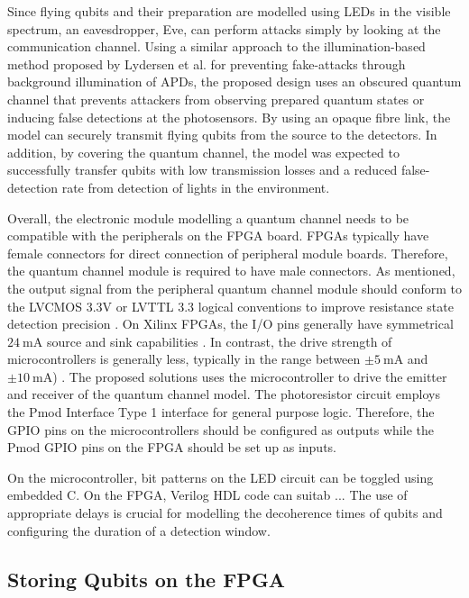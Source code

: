 Since flying qubits and their preparation are modelled using LEDs in the visible spectrum, an eavesdropper, Eve, can perform attacks simply by looking at the communication channel. Using a similar approach to the illumination-based method proposed by Lydersen et al. for preventing fake-attacks through background illumination of APDs, the proposed design uses an obscured quantum channel that prevents attackers from observing prepared quantum states or inducing false detections at the photosensors. By using an opaque fibre link, the model can securely transmit flying qubits from the source to the detectors. In addition, by covering the quantum channel, the model was expected to successfully transfer qubits with low transmission losses and a reduced false-detection rate from detection of lights in the environment. 

Overall, the electronic module modelling a quantum channel needs to be compatible with the peripherals on the FPGA board. FPGAs typically have female connectors for direct connection of peripheral module boards. Therefore, the quantum channel module is required to have male connectors. As mentioned, the output signal from the peripheral quantum channel module should conform to the LVCMOS 3.3V or LVTTL 3.3 logical conventions to improve resistance state detection precision \cite{diligent2011pmod}. On Xilinx FPGAs, the I/O pins generally have symmetrical $\SI{24}{\milli\ampere}$ source and sink capabilities \cite{diligent2011pmod}. In contrast, the drive strength of microcontrollers is generally less, typically in the range between $\pm\SI{5}{\milli\ampere}$ and $\pm\SI{10}{\milli\ampere}$) \cite{diligent2011pmod}. The proposed solutions uses the microcontroller to drive the emitter and receiver of the quantum channel model. The photoresistor circuit employs the Pmod Interface Type 1 interface for general purpose logic. Therefore, the GPIO pins on the microcontrollers should be configured as outputs while the Pmod GPIO pins on the FPGA should be set up as inputs. 

On the microcontroller, bit patterns on the LED circuit can be toggled using embedded C. On the FPGA, Verilog HDL code can suitab ... The use of appropriate delays is crucial for modelling the decoherence times of qubits and configuring the duration of a detection window. 

\subsection{Storing Qubits on the FPGA}

